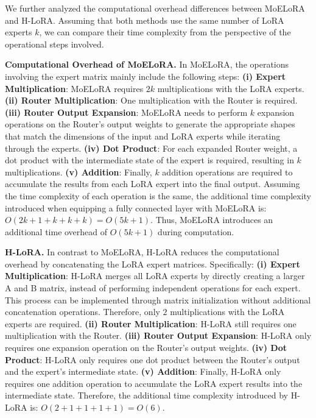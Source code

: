 We further analyzed the computational overhead differences between MoELoRA and H-LoRA. Assuming that both methods use the same number of LoRA experts $k$, we can compare their time complexity from the perspective of the operational steps involved.

\noindent \textbf{Computational Overhead of MoELoRA.} In MoELoRA, the operations involving the expert matrix mainly include the following steps: 
\textbf{(i) Expert Multiplication}: MoELoRA requires $2k$ multiplications with the LoRA experts. 
\textbf{(ii) Router Multiplication}: One multiplication with the Router is required. 
\textbf{(iii) Router Output Expansion}: MoELoRA needs to perform $k$ expansion operations on the Router's output weights to generate the appropriate shapes that match the dimensions of the input and LoRA experts while iterating through the experts. 
\textbf{(iv) Dot Product}: For each expanded Router weight, a dot product with the intermediate state of the expert is required, resulting in $k$ multiplications. 
\textbf{(v) Addition}: Finally, $k$ addition operations are required to accumulate the results from each LoRA expert into the final output. Assuming the time complexity of each operation is the same, the additional time complexity introduced when equipping a fully connected layer with MoELoRA is: 
$O(2k + 1 + k + k + k) = O(5k + 1)$.
Thus, MoELoRA introduces an additional time overhead of $O(5k + 1)$ during computation.

\noindent \textbf{H-LoRA.} In contrast to MoELoRA, H-LoRA reduces the computational overhead by concatenating the LoRA expert matrices. Specifically:
\textbf{(i) Expert Multiplication}: H-LoRA merges all LoRA experts by directly creating a larger A and B matrix, instead of performing independent operations for each expert. This process can be implemented through matrix initialization without additional concatenation operations. Therefore, only $2$ multiplications with the LoRA experts are required. 
\textbf{(ii) Router Multiplication}: H-LoRA still requires one multiplication with the Router. 
\textbf{(iii) Router Output Expansion}: H-LoRA only requires one expansion operation on the Router's output weights. 
\textbf{(iv) Dot Product}: H-LoRA only requires one dot product between the Router's output and the expert's intermediate state. 
\textbf{(v) Addition}: Finally, H-LoRA only requires one addition operation to accumulate the LoRA expert results into the intermediate state. Therefore, the additional time complexity introduced by H-LoRA is:
$O(2 + 1 + 1 + 1 + 1) = O(6)$.

